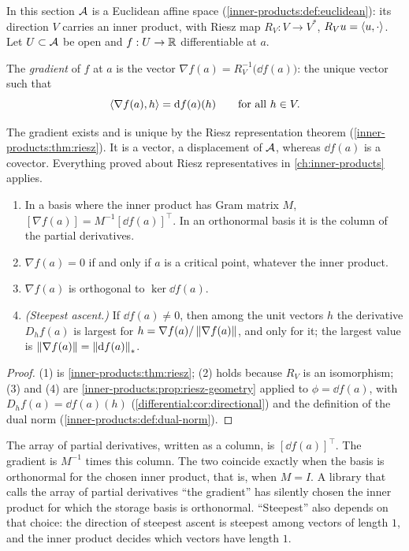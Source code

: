 \begin{notechapter}
In this section $\mathcal{A}$ is a Euclidean affine space
(\cref{inner-products:def:euclidean}): its direction $V$ carries an inner
product, with Riesz map $R_V:V\to V^*$, $R_Vu = \left\langle u, \cdot \right\rangle$. Let
$U\subset\mathcal{A}$ be open and $f:U\to\mathbb{R}$ differentiable at $a$.

\begin{definition}[Gradient]\label{gradient-hessian:def:gradient}
The \emph{gradient} of $f$ at $a$ is the vector
$\nabla f(a) = R_V^{-1}\bigl(\dd f(a)\bigr)$: the unique vector such that
\[
  \left\langle \nabla f(a), h \right\rangle = \mathrm{d} f(a)(h) \qquad\text{for all } h\in V .
\]
\end{definition}

The gradient exists and is unique by the Riesz representation theorem
(\cref{inner-products:thm:riesz}). It is a vector, a displacement of
$\mathcal{A}$, whereas $\dd f(a)$ is a covector. Everything proved about Riesz
representatives in \cref{ch:inner-products} applies.

\begin{proposition}
\label{gradient-hessian:prop:gradient}
\begin{enumerate}[nosep]
  \item In a basis where the inner product has Gram matrix $M$,
        $[\nabla f(a)] = M^{-1}[\dd f(a)]^\top$. In an orthonormal basis
        it is the column of the partial derivatives.
  \item $\nabla f(a) = 0$ if and only if $a$ is a critical point, whatever
        the inner product.
  \item $\nabla f(a)$ is orthogonal to $\ker\dd f(a)$.
  \item \emph{(Steepest ascent.)} If $\dd f(a)\neq0$, then among the unit
        vectors $h$ the derivative $D_hf(a)$ is largest for
        $h = \nabla f(a)/\left\|\nabla f(a)\right\|$, and only for it; the largest
        value is $\left\|\nabla f(a)\right\| = \left\|\mathrm{d} f(a)\right\|_*$.
\end{enumerate}
\end{proposition}

\begin{proof}
(1) is \cref{inner-products:thm:riesz}; (2) holds because $R_V$ is an
isomorphism; (3) and (4) are \cref{inner-products:prop:riesz-geometry}
applied to $\phi = \dd f(a)$, with $D_hf(a) = \dd f(a)(h)$
(\cref{differential:cor:directional}) and the definition of the dual norm
(\cref{inner-products:def:dual-norm}).
\end{proof}

\begin{pitfall}
The array of partial derivatives, written as a column, is
$[\dd f(a)]^\top$. The gradient is $M^{-1}$ times this column. The two
coincide exactly when the basis is orthonormal for the chosen inner
product, that is, when $M = I$. A library that calls the array of partial
derivatives ``the gradient'' has silently chosen the inner product for
which the storage basis is orthonormal. ``Steepest'' also depends on that
choice: the direction of steepest ascent is steepest among vectors of
length $1$, and the inner product decides which vectors have length $1$.
\end{pitfall}


\end{notechapter}
